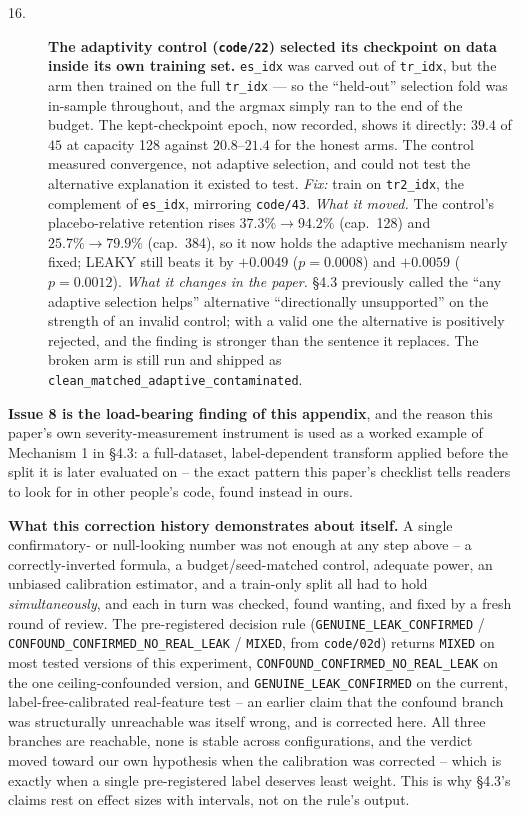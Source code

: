 \documentclass[10pt]{article} %
\begin{document}
\begin{description}
\item[16.] \textbf{The adaptivity control (\texttt{code/22}) selected its
  checkpoint on data inside its own training set.} \texttt{es\_idx} was carved
  out of \texttt{tr\_idx}, but the arm then trained on the full
  \texttt{tr\_idx} --- so the ``held-out'' selection fold was in-sample
  throughout, and the argmax simply ran to the end of the budget. The
  kept-checkpoint epoch, now recorded, shows it directly: $39.4$ of $45$ at
  capacity 128 against $20.8$--$21.4$ for the honest arms. The control
  measured convergence, not adaptive selection, and could not test the
  alternative explanation it existed to test. \textit{Fix:} train on
  \texttt{tr2\_idx}, the complement of \texttt{es\_idx}, mirroring
  \texttt{code/43}. \textit{What it moved.} The control's placebo-relative
  retention rises $37.3\%\to\mathbf{94.2\%}$ (cap.\ 128) and
  $25.7\%\to\mathbf{79.9\%}$ (cap.\ 384), so it now holds the adaptive
  mechanism nearly fixed; LEAKY still beats it by $+0.0049$ ($p=0.0008$) and
  $+0.0059$ ($p=0.0012$). \textit{What it changes in the paper.} §4.3
  previously called the ``any adaptive selection helps'' alternative
  ``directionally unsupported'' on the strength of an invalid control; with a
  valid one the alternative is positively rejected, and the finding is
  stronger than the sentence it replaces. The broken arm is still run and
  shipped as \texttt{clean\_matched\_adaptive\_contaminated}.
\end{description}

\textbf{Issue 8 is the load-bearing finding of this appendix}, and the
reason this paper's own severity-measurement instrument is used as a
worked example of Mechanism 1 in §4.3: a full-dataset, label-dependent
transform applied before the split it is later evaluated on -- the exact
pattern this paper's checklist tells readers to look for in other
people's code, found instead in ours.

\textbf{What this correction history demonstrates about itself.} A single
confirmatory- or null-looking number was not enough at any step above -- a
correctly-inverted formula, a budget/seed-matched control, adequate power, an
unbiased calibration estimator, and a train-only split all had to hold
\emph{simultaneously}, and each in turn was checked, found wanting, and fixed
by a fresh round of review. The pre-registered decision rule
(\texttt{GENUINE\_LEAK\_CONFIRMED} /
\texttt{CONFOUND\_CONFIRMED\_NO\_REAL\_LEAK} / \texttt{MIXED}, from
\texttt{code/02d}) returns \texttt{MIXED} on most tested versions of this
experiment, \texttt{CONFOUND\_CONFIRMED\_NO\_REAL\_LEAK} on the one
ceiling-confounded version, and \texttt{GENUINE\_LEAK\_CONFIRMED} on the
current, label-free-calibrated real-feature test -- an earlier claim that the
confound branch was structurally unreachable was itself wrong, and is
corrected here. All three branches are reachable, none is stable across
configurations, and the verdict moved toward our own hypothesis when the
calibration was corrected -- which is exactly when a single pre-registered
label deserves least weight. This is why §4.3's claims rest on effect sizes
with intervals, not on the rule's output.
\end{document}
